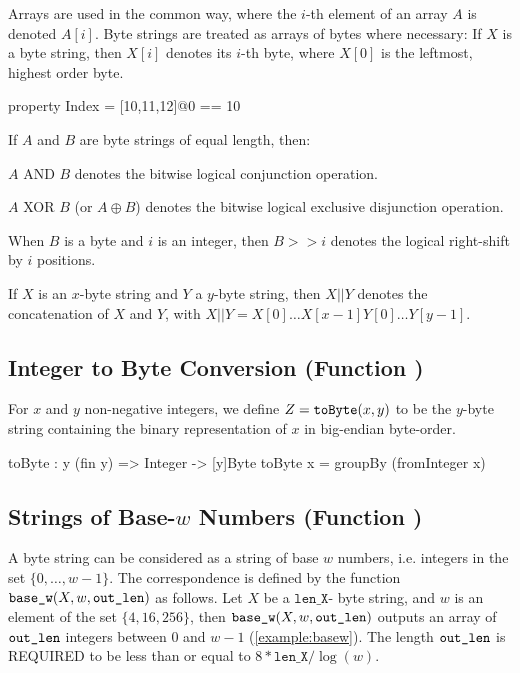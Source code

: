    Arrays are used in the common way, where the $i$-th element of an array
   $A$ is denoted $A[i]$.  Byte strings are treated as arrays of bytes where
   necessary: If $X$ is a byte string, then $X[i]$ denotes its $i$-th byte,
   where $X[0]$ is the leftmost, highest order byte.

\begin{code}
  property Index = [10,11,12]@0 == 10
\end{code}

   If $A$ and $B$ are byte strings of equal length, then:
   \begin{description}
    \item $A$ AND $B$ denotes the bitwise logical conjunction operation.
    \item $A$ XOR $B$ (or $A \oplus B$) denotes the bitwise logical exclusive disjunction
      operation.
   \end{description}

   When $B$ is a byte and $i$ is an integer, then $B >> i$ denotes the logical
   right-shift by $i$ positions.

   If $X$ is an $x$-byte string and $Y$ a $y$-byte string, then $X || Y$ denotes
   the concatenation of $X$ and $Y$, with $X || Y = X[0] \ldots X[x-1] Y[0] \ldots
   Y[y-1]$.

\subsection{Integer to Byte Conversion (Function \toByte)}\label{func:tobyte}

   For $x$ and $y$  non-negative integers, we define $Z = \texttt{toByte}(x, y)$ to
   be the $y$-byte string containing the binary representation of $x$ in
   big-endian byte-order.

\begin{code}
  toByte : {y} (fin y) => Integer -> [y]Byte
  toByte x = groupBy (fromInteger x)
\end{code}

\subsection{Strings of Base-$w$ Numbers (Function \basew)}\label{func:basew}

   A byte string can be considered as a string of base $w$ numbers, i.e.
   integers in the set $\{0, \ldots , w - 1\}$.  The correspondence is defined
   by the function $\texttt{base\_w}(X, w, \texttt{out\_len})$ as follows.  Let $X$ be a $\texttt{len\_X}$-
   byte string, and $w$ is an element of the set $\{4, 16, 256\}$, then $\texttt{base\_w}(X, w,
   \texttt{out\_len})$ outputs an array of $\texttt{out\_len}$ integers between $0$ and $w - 1$ (\autoref{example:basew}).
   The length $\texttt{out\_len}$ is REQUIRED to be less than or equal to $8 * \texttt{len\_X}
   / \log(w)$.

